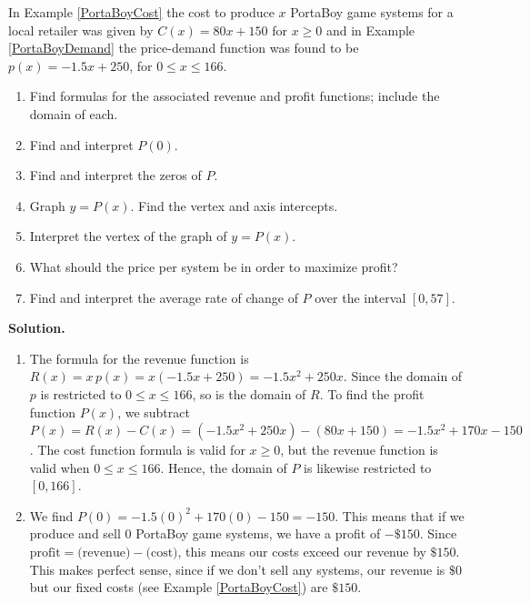 \documentclass{ximera}
\begin{document}
\begin{ex}  \label{PortaBoyProfit}  In Example \ref{PortaBoyCost} the cost to produce $x$ PortaBoy game systems for a local retailer was given by $C(x) = 80x + 150$ for $x \geq 0$ and in Example \ref{PortaBoyDemand} the price-demand function was found to be $p(x) = -1.5x+250$, for $0 \leq x \leq 166$.

\begin{enumerate}

\item  Find formulas for the associated revenue and profit functions;   include the domain of each.

\item Find and interpret $P(0)$.

\item  Find and interpret the zeros of $P$.

\item  Graph $y = P(x)$. Find the vertex and axis intercepts.

\item  Interpret the vertex of the graph of $y = P(x)$.

\item What should the price per system be in order to maximize profit?

\item Find and interpret the average rate of change of $P$ over the interval $[0, 57]$.

\end{enumerate}

{\bf Solution.}  

\begin{enumerate}

\item  The formula for the revenue function is $R(x) = x \, p(x) = x(-1.5x+250) = -1.5x^2 + 250x$. Since the domain of $p$ is restricted to  $0 \leq x \leq 166$, so is the domain of $R$.    To find the profit function $P(x)$, we subtract $P(x) = R(x) - C(x) = \left(-1.5x^2+250x\right) - \left(80x + 150\right) = -1.5x^2+170x-150$.    The cost function formula is valid for $x \geq 0$, but the revenue function is valid when $0 \leq x \leq 166$.  Hence, the domain of $P$ is likewise restricted to $[0, 166]$. 

\item We find $P(0) = -1.5(0)^2+170(0) - 150 = -150$.  This means that if we produce and sell $0$ PortaBoy game systems, we have a profit of $- \$ 150$.  Since $\text{profit} = \text{(revenue)} - \text{(cost)}$, this means our costs exceed our revenue by $\$150$. This makes perfect sense, since if we don't sell any systems, our revenue is $\$0$ but our fixed costs (see Example  \ref{PortaBoyCost}) are $\$150$.


\end{enumerate}
\end{ex}
\end{document}
